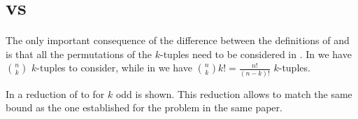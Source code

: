 \section{\kSUM vs \kLDT}

The only important consequence of the difference between the definitions of
\kSUM and \kLDT is that all the permutations of the $k$-tuples need to be
considered in \kLDT. In \kSUM we have $\binom{n}{k}$ $k$-tuples to consider,
while in \kLDT we have $\binom{n}{k} k! = \frac{n!}{(n-k)!}$ $k$-tuples.

In \cite{gronlund:2014} a reduction of \kLDT to \threeSUM for $k$ odd is shown.
This reduction allows to match the same 
bound as the one established for the \kSUM problem in the same paper.

